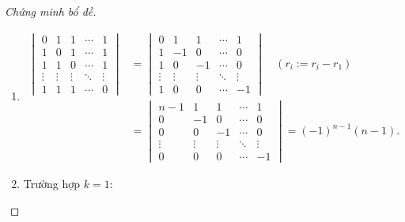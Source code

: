 \documentclass[class=nhvh-linear-algebra,crop=false]{standalone}
\begin{document}
\begin{proof}[Chứng minh bổ đề]
    \begin{enumerate}[label = (\roman*)]
        \item
              \begingroup{}
              \allowdisplaybreaks{}
              \begin{align*}
                  \begin{vmatrix}
                      0      & 1      & 1      & \cdots & 1      \\
                      1      & 0      & 1      & \cdots & 1      \\
                      1      & 1      & 0      & \cdots & 1      \\
                      \vdots & \vdots & \vdots & \ddots & \vdots \\
                      1      & 1      & 1      & \cdots & 0
                  \end{vmatrix}
                   & =
                  \begin{vmatrix}
                      0      & 1      & 1      & \cdots & 1      \\
                      1      & -1     & 0      & \cdots & 0      \\
                      1      & 0      & -1     & \cdots & 0      \\
                      \vdots & \vdots & \vdots & \ddots & \vdots \\
                      1      & 0      & 0      & \cdots & -1
                  \end{vmatrix}\quad(r_{i}:= r_{i} - r_{1}) \\
                   & =
                  \begin{vmatrix}
                      n-1    & 1      & 1      & \cdots & 1      \\
                      0      & -1     & 0      & \cdots & 0      \\
                      0      & 0      & -1     & \cdots & 0      \\
                      \vdots & \vdots & \vdots & \ddots & \vdots \\
                      0      & 0      & 0      & \cdots & -1
                  \end{vmatrix}
                  = {(-1)}^{n-1}(n-1).
              \end{align*}
              \endgroup{}
        \item
              \par Trường hợp $k = 1$:

\end{enumerate}
\end{proof}
\end{document}
